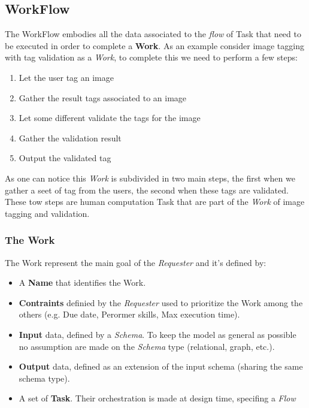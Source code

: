 \subsection{WorkFlow}
The WorkFlow embodies all the data associated to the \emph{flow} of Task
that need to be executed in order to complete a \textbf{Work}. As an example
consider image tagging with tag validation as a \emph{Work}, to complete this
we need to perform a few steps:
\begin{enumerate}
    \item Let the user tag an image
    \item Gather the result tags associated to an image
    \item Let some different validate the tags for the image
    \item Gather the validation result
    \item Output the validated tag
\end{enumerate}
As one can notice this \emph{Work} is subdivided in two main steps, the first
when we gather a seet of tag from the users, the second  when these tags are
validated. These tow steps are human computation Task that are part of the
\emph{Work} of image tagging and validation.

\subsubsection{The Work}
The Work represent the main goal of the \emph{Requester} and it's defined by:
\begin{itemize}
    \item A \textbf{Name} that identifies the Work.

    \item \textbf{Contraints} definied by the \emph{Requester} used to prioritize
    the Work among the others (e.g. Due date, Perormer skills, Max execution time).

    \item \textbf{Input} data, defined by a \emph{Schema}. To keep the model as
    general as possible no assumption are made on the \emph{Schema} type
    (relational, graph, etc.).
    \item \textbf{Output} data, defined as an extension of the input schema
    (sharing the same schema type).

    \item A set of \textbf{Task}. Their orchestration is made at design time,
    specifing a \emph{Flow}
\end{itemize}







